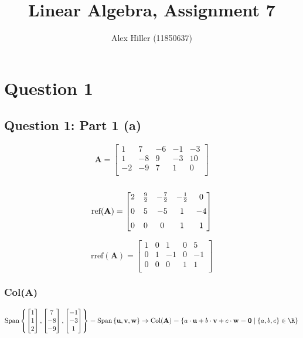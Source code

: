 \documentclass{article}
\author{Alex Hiller (11850637)}
\title{Linear Algebra, Assignment 7}
\begin{document}
\maketitle
\tableofcontents
\clearpage

\section{Question 1} 
\subsection{Question 1: Part 1 (a)} 

\[%
    \mathbf{A} 
    = 
    \begin{bmatrix} 
        1 & 7 & -6 & -1 & -3 \\
		1 & -8 & 9 & -3 & 10 \\
		-2 & -9 & 7 & 1 & 0\\		
    \end{bmatrix}
\]%
\\
\[%
    \text{ref} (\mathbf{A}) 
    =
    \begin{bmatrix} \vspace{2mm}
        2 & \frac{9}{2}  & -\frac{7}{2}  & -\frac{1}{2}  & 0 \\ \vspace{2mm}
		0 & 5 & -5 & 1 & -4 \\
		0 & 0 & 0 & 1 & 1 \\		
    \end{bmatrix}
\]%

\[%
    \text{rref} (\mathbf{A}) 
    = 
    \begin{bmatrix} 
        1 & 0 & 1 & 0 & 5 \\
		0 & 1 & -1 & 0 & -1 \\
		0 & 0 & 0 & 1 & 1 \\		
    \end{bmatrix}
\]%

\subsubsection{Col(\textbf{A})} 

\[%
    \text{Span} \left\{
    \begin{bmatrix} 1\\1\\2\\ \end{bmatrix},
    \begin{bmatrix} 7\\-8\\-9\\ \end{bmatrix},
    \begin{bmatrix} -1\\-3\\1\\ \end{bmatrix}
    \right\}
    =
    \text{Span} \left\{ 
    \mathbf{u},\mathbf{v},\mathbf{w}\right\}
    \Rightarrow 
    \text{Col}(\mathbf{A}) = 
    \left\{  
    a \cdot \mathbf{u} +
    b \cdot \mathbf{v} +
    c \cdot \mathbf{w} 
    =
    \mathbf{0}
    \mid
    \left\{ a,b,c \right\} \in \R
    \right\}
\]%
\end{document}
